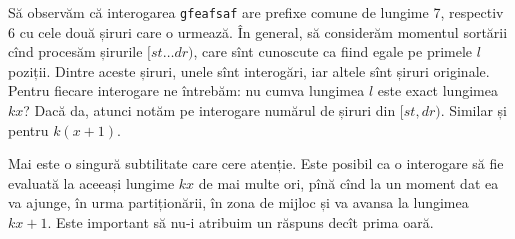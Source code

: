 \documentclass[../main.tex]{subfiles}
\begin{document}
Să observăm că interogarea \texttt{gfeafsaf} are prefixe comune de lungime 7, respectiv 6 cu cele două șiruri care o urmează. În general, să considerăm momentul sortării cînd procesăm șirurile $[st \dots dr)$, care sînt cunoscute ca fiind egale pe primele $l$ poziții. Dintre aceste șiruri, unele sînt interogări, iar altele sînt șiruri originale. Pentru fiecare interogare ne întrebăm: nu cumva lungimea $l$ este exact lungimea $kx$? Dacă da, atunci notăm pe interogare numărul de șiruri din $[st, dr)$. Similar și pentru $k(x+1)$.

Mai este o singură subtilitate care cere atenție. Este posibil ca o interogare să fie evaluată la aceeași lungime $kx$ de mai multe ori, pînă cînd la un moment dat ea va ajunge, în urma partiționării, în zona de mijloc și va avansa la lungimea $kx + 1$. Este important să nu-i atribuim un răspuns decît prima oară.
\end{document}
